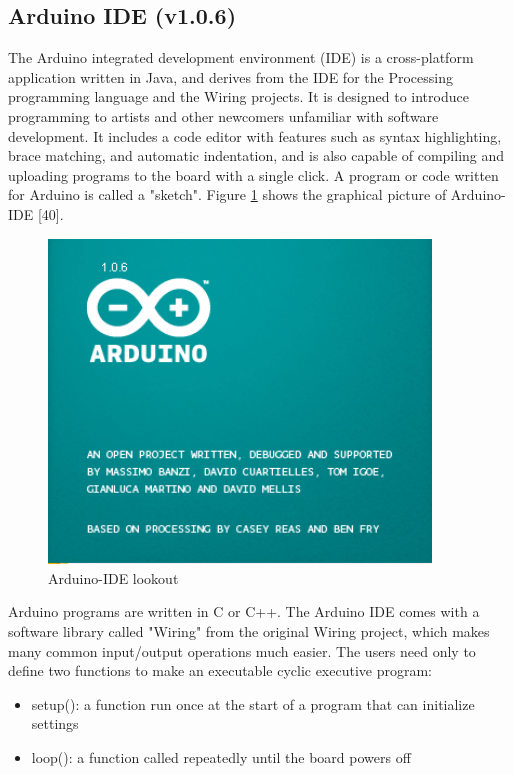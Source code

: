 \subsection{Arduino IDE (v1.0.6)}
The Arduino integrated development environment (IDE) is a cross-platform application written in Java, and derives from the IDE for the Processing programming language and the Wiring projects. It is designed to introduce programming to artists and other newcomers unfamiliar with software development. It includes a code editor with features such as syntax highlighting, brace matching, and automatic indentation, and is also capable of compiling and uploading programs to the board with a single click. A program or code written for Arduino is called a "sketch". Figure \ref{fig10} shows the graphical picture of Arduino-IDE [40].


\begin{figure}[h]
  \centering
  \includegraphics[width=4in]{10}
  \caption{Arduino-IDE lookout}\label{fig10}
\end{figure}

Arduino programs are written in C or C++. The Arduino IDE comes with a software library called "Wiring" from the original Wiring project, which makes many common input/output operations much easier. The users need only to define two functions to make an executable cyclic executive program:

\begin{itemize}
  \item setup(): a function run once at the start of a program that can initialize settings
  \item	loop(): a function called repeatedly until the board powers off
\end{itemize}


